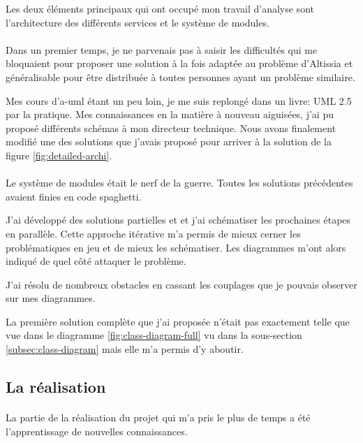 Les deux éléments principaux qui ont occupé mon travail d'analyse sont l'architecture des différents services et le système de modules.

\paragraph{}
Dans un premier temps, je ne parvenais pas à saisir les difficultés qui me bloquaient pour proposer une solution à la fois adaptée au problème d'Altissia et généralisable pour être distribuée à toutes personnes ayant un problème similaire.

Mes cours d'\gls{a-uml} étant un peu loin, je me suis replongé dans un livre: UML 2.5 par la pratique\cite{roques_uml_2018}.
Mes connaissances en la matière à nouveau aiguisées, j'ai pu proposé différents schémas à mon directeur technique.
Nous avons finalement modifié une des solutions que j'avais proposé pour arriver à la solution de la figure \ref{fig:detailed-archi}.

\paragraph{}
Le système de modules était le nerf de la guerre.
Toutes les solutions précédentes avaient finies en code spaghetti\fnmark{}.

J'ai développé des solutions partielles et et j'ai schématiser les prochaines étapes en parallèle.
Cette approche itérative m'a permis de mieux cerner les problématiques en jeu et de mieux les schématiser.
Les diagrammes m'ont alors indiqué de quel côté attaquer le problème.

J'ai résolu de nombreux obstacles en cassant les couplages que je pouvais observer sur mes diagrammes.

La première solution complète que j'ai proposée n'était pas exactement telle que vue dans le diagramme \ref{fig:class-diagram-full} vu dans la sous-section \ref{subsec:class-diagram} mais elle m'a permis d'y aboutir.

\subsection{La réalisation}
\label{subsec:realisation}

\paragraph{}
La partie de la réalisation du projet qui m'a pris le plus de temps a été l'apprentissage de nouvelles connaissances.

